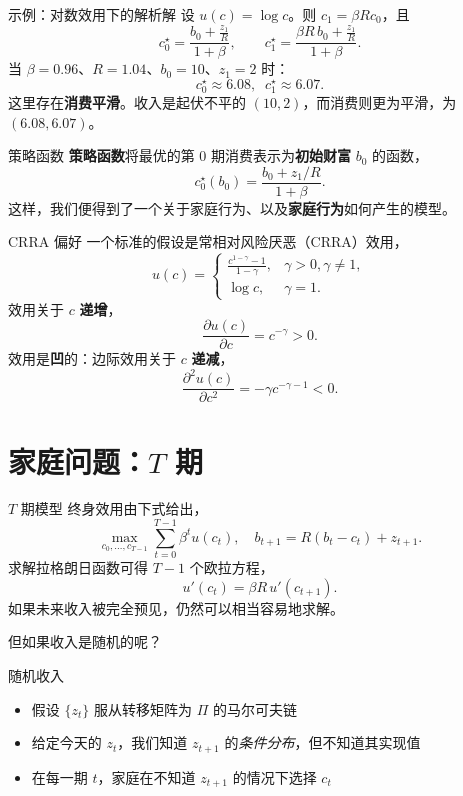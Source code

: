 \documentclass[10pt,aspectratio=169]{beamer}
\begin{document}
\begin{frame}{示例：对数效用下的解析解}
  设 $u(c) = \log c$。则 $c_1 = \beta R c_0$，且
  \[
    c_0^\star = \frac{b_0 + \frac{z_1}{R}}{1+\beta},
    \qquad
    c_1^\star = \frac{\beta R \, b_0 + \frac{z_1}{R}}{1+\beta}.
  \]
  当 $\beta = 0.96$、$R = 1.04$、$b_0 = 10$、$z_1 = 2$ 时：
  \[
    c_0^\star \approx 6.08, \;\; c_1^\star \approx 6.07.
  \]
  这里存在\textbf{消费平滑}。收入是起伏不平的 $(10, 2)$，而消费则更为平滑，为 $(6.08, 6.07)$。
\end{frame}

\begin{frame}{策略函数}
  \textbf{策略函数}将最优的第 0 期消费表示为\textbf{初始财富} $b_0$ 的函数，
  \[
    c_0^\star(b_0) = \frac{b_0 + z_1/R}{1+\beta}.
  \]
  这样，我们便得到了一个关于家庭行为、以及\textbf{家庭行为}如何产生的模型。
\end{frame}

\begin{frame}{CRRA 偏好}
  一个标准的假设是常相对风险厌恶（CRRA）效用，
  \[
    u(c) = \begin{cases}
      \frac{c^{1-\gamma}-1}{1-\gamma}, & \gamma > 0, \gamma \neq 1, \\
      \log c, & \gamma = 1.
    \end{cases}
  \]
  效用关于 $c$ \textbf{递增}，
  \[
    \frac{\partial u(c)}{\partial c} = c^{-\gamma} > 0.
  \]
  效用是\textbf{凹}的：边际效用关于 $c$ \textbf{递减}，
  \[
    \frac{\partial^2 u(c)}{\partial c^2} = -\gamma c^{-\gamma-1} < 0.
  \]
\end{frame}

\section{家庭问题：$T$ 期}

\begin{frame}{$T$ 期模型}
  终身效用由下式给出，
  \[
    \max_{c_0, \ldots, c_{T-1}} \sum_{t=0}^{T-1} \beta^t u(c_t),
    \quad b_{t+1} = R(b_t - c_t) + z_{t+1}.
  \]
  求解拉格朗日函数可得 $T-1$ 个欧拉方程，
  \[
    u'(c_t) = \beta R \, u'(c_{t+1}).
  \]
  如果未来收入被完全预见，仍然可以相当容易地求解。

  但如果收入是随机的呢？
\end{frame}

\begin{frame}{随机收入}
  \begin{itemize}
    \item 假设 $\{z_t\}$ 服从转移矩阵为 $\Pi$ 的马尔可夫链
    \item 给定今天的 $z_t$，我们知道 $z_{t+1}$ 的\emph{条件分布}，但不知道其实现值
    \item 在每一期 $t$，家庭在不知道 $z_{t+1}$ 的情况下选择 $c_t$
  \end{itemize}
\end{frame}
\end{document}
